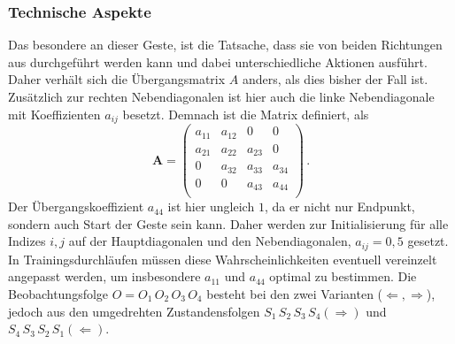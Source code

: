 \subsubsection{Technische Aspekte}
Das besondere an dieser Geste, ist die Tatsache, dass sie von beiden Richtungen aus durchgef\"uhrt werden kann und dabei unterschiedliche Aktionen ausf\"uhrt.
\newline
Daher verh\"alt sich die \"Ubergangsmatrix $A$ anders, als dies bisher der Fall ist. Zus\"atzlich zur rechten Nebendiagonalen ist hier auch die linke Nebendiagonale mit Koeffizienten $a_{ij}$ besetzt. Demnach ist die Matrix definiert, als
\begin{equation}
\mathbf{A} = 
\begin{pmatrix}
a_{11} & a_{12} & 0 & 0\\
 a_{21} & a_{22} & a_{23} & 0\\
0 &  a_{32} & a_{33} & a_{34}\\
0 & 0 & a_{43} & a_{44} \\
\end{pmatrix} \, .
\end{equation}
Der \"Ubergangskoeffizient $a_{44}$ ist hier ungleich $1$, da er nicht nur Endpunkt, sondern auch Start der Geste sein kann. Daher werden zur Initialisierung f\"ur alle Indizes $i, j$ auf der Hauptdiagonalen und den Nebendiagonalen, $a_{ij} = 0,5$ gesetzt. In Trainingsdurchl\"aufen m\"ussen diese Wahrscheinlichkeiten eventuell vereinzelt angepasst werden, um insbesondere $a_{11}$ und $a_{44}$ optimal zu bestimmen. Die Beobachtungsfolge $O = O_1\, O_2\, O_3\, O_4$ besteht bei den zwei Varianten ($\Leftarrow, \Rightarrow$), jedoch aus den umgedrehten Zustandensfolgen $S_1\, S_2\, S_3\, S_4 (\Rightarrow)$ und $S_4\, S_3\, S_2\, S_1 (\Leftarrow)$.

